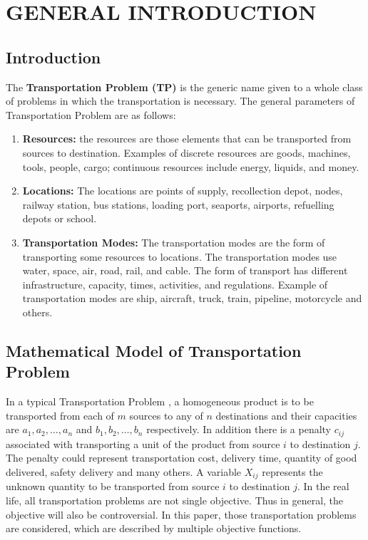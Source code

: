 \documentclass[12pt]{report}
\newcommand{\bt}[1]{\textbf{#1}}
\newcommand{\tp}{Transportation Problem }
\newcommand{\stps}{transportation problems }
\begin{document}
	\tableofcontents
	\newpage
	
	\chapter{GENERAL INTRODUCTION}
	
	\section{Introduction}
	The \bt{\tp (TP)} is the generic name given to a whole class of problems in which the transportation is necessary. The general parameters of \tp are as follows:
	\begin{enumerate}
		\renewcommand{\labelenumi}{(\Alph{enumi})}
		\item \bt{Resources:} the resources are those elements that can be transported from sources to destination. Examples of discrete resources are goods, machines, tools, people, cargo; continuous resources include energy, liquids, and money.
		
		\item \bt{Locations:} The locations are points of supply, recollection depot, nodes, railway station, bus stations, loading port, seaports, airports, refuelling depots or school.
		
		\item \bt{Transportation Modes:} The transportation modes are the form of transporting some resources to locations. The transportation modes use water, space, air, road, rail, and cable. The form of transport has different infrastructure, capacity, times, activities, and regulations. Example of transportation modes are ship, aircraft, truck, train, pipeline, motorcycle and others.
	\end{enumerate}

	\section{Mathematical Model of \tp}
	In a typical \tp, a homogeneous product is to be transported from each of $m$ sources to any of $n$ destinations and their capacities are $a_1, a_2,\ldots,a_n$ and $b_1, b_2,\ldots, b_n$ respectively. In addition there is a penalty $c_{ij}$ associated with transporting a unit of the product from source $i$ to destination $j$. The penalty could represent transportation cost, delivery time, quantity of good delivered, safety delivery and many others. A variable $X_{ij}$ represents the unknown quantity to be transported from source $i$ to destination $j$. In the real life, all transportation problems are not single objective. Thus in general, the objective will also be controversial. In this paper, those \stps are considered, which are described by multiple objective functions.\\
	
\end{document}
